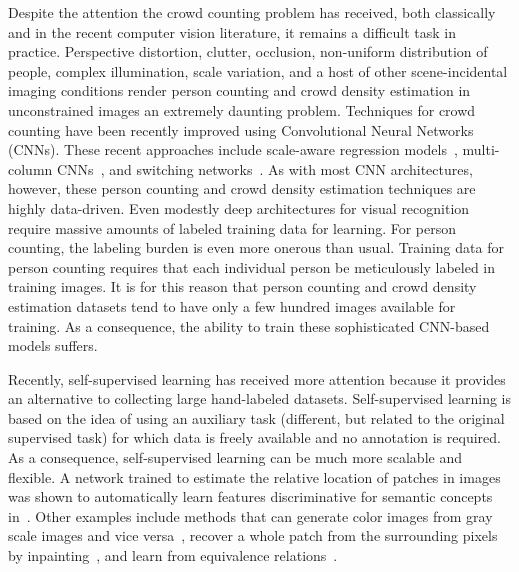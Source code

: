 \documentclass[10pt,twocolumn,letterpaper]{article}
\begin{document}
Despite the attention the crowd counting problem has received, both classically and in the recent computer vision literature, it remains a difficult task in practice. Perspective distortion, clutter, occlusion, non-uniform distribution of people, complex illumination, scale variation, and a host of other scene-incidental imaging conditions render person counting and crowd density estimation in unconstrained images an extremely daunting problem. Techniques for crowd counting have been recently improved using
Convolutional Neural Networks (CNNs). These recent approaches include scale-aware regression models~\cite{onoro2016towards}, multi-column CNNs~\cite{zhang2016single}, and switching networks~\cite{Sam_2017_CVPR}. As with most CNN architectures, however, these person counting and crowd density estimation techniques are highly data-driven. Even modestly deep architectures for visual recognition require massive amounts of labeled training data for learning. For person counting, the labeling burden is even more onerous than usual. Training data for person counting requires that each individual person be meticulously labeled in training images. It is for this reason that person counting and crowd density estimation datasets tend to have only a few hundred images available for training. As a consequence, the ability to train these sophisticated CNN-based models suffers.

Recently, self-supervised learning has received more attention because
it provides an alternative to collecting large hand-labeled
datasets. Self-supervised learning is based on the idea of using an
auxiliary task (different, but related to the original supervised
task) for which data is freely available and no annotation is
required. As a consequence, self-supervised learning can be much more
scalable and flexible. A network trained to estimate the relative
location of patches in images was shown to automatically learn
features discriminative for semantic concepts
in~\cite{doersch2015unsupervised}. Other examples include methods that
can generate color images from gray scale images and vice
versa~\cite{larsson2017colorization,zhang2016colorful}, recover a
whole patch from the surrounding pixels by
inpainting~\cite{pathak2016context}, and learn from equivalence
relations~\cite{noroozi2017representation}.
\end{document}
